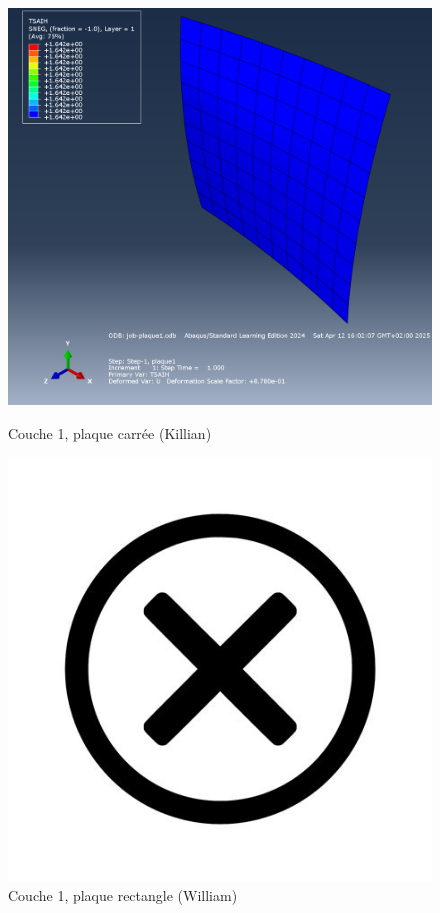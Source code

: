 \documentclass[a4paper,12pt]{article}
\begin{document}
\begin{figure}[h!]
	\centering
	\begin{minipage}[t][0.3\textheight]{0.495\textwidth}
		\centering
		\includegraphics[width=\textwidth]{media/K_P1_L1_12042025.png} %
		\caption{Couche 1, plaque carrée (Killian)}
		\label{fig:image1}
	\end{minipage}
	\hfill
	\begin{minipage}[t][0.3\textheight]{0.495\textwidth}
		\centering
		\includegraphics[width=\textwidth]{media/no-image.jpg} %
		\caption{Couche 1, plaque rectangle (William)}
		\label{fig:image2}
	\end{minipage}
\end{figure}
\end{document}
